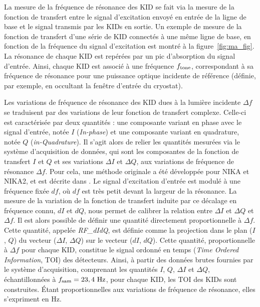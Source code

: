 La mesure de la fréquence de résonance des KID se fait via la mesure
de la fonction de transfert entre le signal d'excitation envoyé en
entrée de la ligne de base et le signal transmis par les KIDs en
sortie. Un exemple de mesure de la fonction de transfert d'une série
de KID connectés à une même ligne de base, en fonction de la fréquence
du signal d'excitation est montré à la figure~\ref{fig:ma_fig}. La
résonance de chaque KID est repérées par un pic d'absorption du signal
d'entrée. Ainsi, chaque KID est associé à une fréquence
$f_{\rm{tone}}$, correspondant à sa fréquence de résonance pour une
puissance optique incidente de référence (définie, par exemple, en
occultant la fenêtre d'entrée du cryostat).

Les variations de fréquence de résonance des KID dues à la lumière
incidente $\Delta f$ se traduisent par des variations de leur fonction
de transfert complexe. Celle-ci est caractérisée par deux
quantités : une composante variant en phase avec le signal d'entrée,
notée $I$ (\emph{In-phase}) et une composante variant en quadrature,
notée $Q$ (\emph{in-Quadrature}). Il s'agit alors de relier les
quantités mesurées via le système d'acquisition de données, qui sont
les composantes de la fonction de transfert $I$ et $Q$ et ses
variations $\Delta I$ et $\Delta Q$, aux variations de fréquence de
résonance $\Delta f$. Pour cela, une méthode originale a
été développée pour NIKA et NIKA2, et est décrite dans
\citet{Calvo2013}.
Le signal d'excitation d'entrée est modulé à une fréquence fixée $df$,
où $df$ est très petit devant la largeur de la résonance. La mesure de
la variation de la fonction de transfert induite par ce décalage en
fréquence connu, $dI$ et $dQ$, nous permet de calibrer la relation
entre $\Delta I$ et $\Delta Q$ et $\Delta f$. Il est alors possible de
définir une quantité directement proportionnelle à $\Delta f$. Cette quantité,
appelée \emph{RF\_dIdQ}, est définie comme la projection dans le plan
($I$, $Q$) du vecteur ($\Delta I$, $\Delta Q$) sur le vecteur ($dI$,
$dQ$). Cette quantité, proportionnelle à $\Delta f$ pour chaque KID,
constitue le signal ordonné en temps (\emph{Time Ordered Information},
TOI) des détecteurs. 
Ainsi, à partir des données brutes fournies par le système
d'acquisition, comprenant les quantités $I$, $Q$, $\Delta I$ et
$\Delta Q$, échantillonnées à $f_{\rm{sam}} = 23,4~\rm{Hz}$, pour
chaque KID, les TOI des KIDs sont construites. \'Etant
proportionnelles aux variations de fréquence de résonance, elles
s'expriment en Hz.

